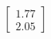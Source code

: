 \documentclass[preview]{standalone}
\begin{document}
\begin{align*}
\begin{bmatrix} 1.77 \\ 2.05 \end{bmatrix}
\end{align*}
\end{document}
